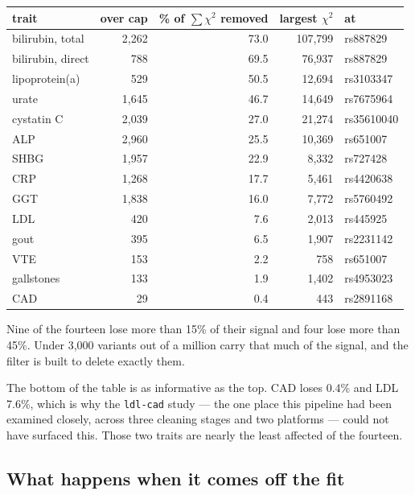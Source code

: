 \begin{center}
\begin{tabular}{@{}lrrrl@{}}
\toprule
trait & over cap & \% of $\sum\chi^2$ removed & largest $\chi^2$ & at \\
\midrule
bilirubin, total  & 2{,}262 & 73.0 & 107{,}799 & rs887829 \\
bilirubin, direct &   788 & 69.5 &  76{,}937 & rs887829 \\
lipoprotein(a)    &   529 & 50.5 &  12{,}694 & rs3103347 \\
urate             & 1{,}645 & 46.7 &  14{,}649 & rs7675964 \\
cystatin C        & 2{,}039 & 27.0 &  21{,}274 & rs35610040 \\
ALP               & 2{,}960 & 25.5 &  10{,}369 & rs651007 \\
SHBG              & 1{,}957 & 22.9 &   8{,}332 & rs727428 \\
CRP               & 1{,}268 & 17.7 &   5{,}461 & rs4420638 \\
GGT               & 1{,}838 & 16.0 &   7{,}772 & rs5760492 \\
LDL               &   420 &  7.6 &   2{,}013 & rs445925 \\
gout              &   395 &  6.5 &   1{,}907 & rs2231142 \\
VTE               &   153 &  2.2 &     758 & rs651007 \\
gallstones        &   133 &  1.9 &   1{,}402 & rs4953023 \\
CAD               &    29 &  0.4 &     443 & rs2891168 \\
\bottomrule
\end{tabular}
\end{center}

Nine of the fourteen lose more than 15\% of their signal and four lose more
than 45\%. Under 3{,}000 variants out of a million carry that much of the
signal, and the filter is built to delete exactly them.

The bottom of the table is as informative as the top. CAD loses 0.4\% and LDL
7.6\%, which is why the \texttt{ldl-cad} study --- the one place this pipeline
had been examined closely, across three cleaning stages and two platforms ---
could not have surfaced this. Those two traits are nearly the least affected of
the fourteen.

\subsection*{What happens when it comes off the fit}

